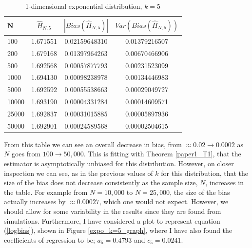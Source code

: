 \documentclass{report}
\begin{document}
\begin{table}
\caption{1-dimensional exponential distribution, $k=5$} \label{expo_k=5_table}
\begin{center}
\begin{tabular}{| l | c c c|} 
\toprule
N & $\hat{H}_{N, 5}$ & $|Bias(\hat{H}_{N, 5})|$ & $Var(Bias(\hat{H}_{N, 5}))$ \\
\midrule[1pt]
100     & 1.671551     & 0.02159648310     & 0.01379216507  \\
200     & 1.679168     & 0.01397964263     & 0.00670466906  \\
500     & 1.692568     & 0.00057877793     & 0.00231523099  \\
1000    & 1.694130     & 0.00098238978     & 0.00134446983  \\
5000    & 1.692592     & 0.00055538663     & 0.00029049727  \\
10000   & 1.693190     & 0.00004331284     & 0.00014609571  \\
25000   & 1.692837     & 0.00031015885     & 0.00005897936  \\
50000   & 1.692901     & 0.00024589568     & 0.00002504615  \\
\hline
\end{tabular}
\end{center}
\end{table}

From this table we can see an overall decrease in bias, from $\approx 0.02 \to 0.0002$ as $N$ goes from $100 \to 50,000$. This is fitting with Theorem \ref{paper1_T1}, that the estimator is asymptotically unbiased for this distribution. However, on closer inspection we can see, as in the previous values of $k$ for this distribution, that the size of the bias does not decrease consistently as the sample size, $N$, increases in the table. For example from $N=10,000$ to $N=25,000$, the size of the bias actually increases by $\approx 0.00027$, which one would not expect. However, we should allow for some variability in the results since they are found from simulations. 
Furthermore, I have considered a plot to represent equation (\ref{logbias}), shown in Figure \ref{expo_k=5_graph}, where I have also found the coefficients of regression to be; $a_{5} = 0.4793$ and $c_{5} = 0.0241$. 
\end{document}
